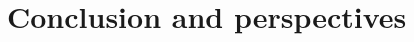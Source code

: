 \documentclass{sintefbeamer}
\begin{document}

\section{Conclusion and perspectives}
\section*{}
\end{document}
